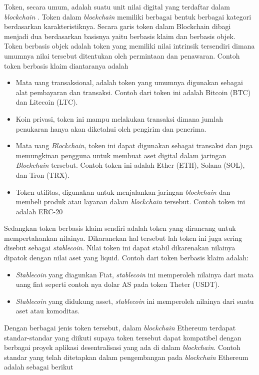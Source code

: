 Token, secara umum, adalah suatu unit nilai digital yang terdaftar dalam \emph{blockchain}  \parencite{PierluigiFreni}. Token dalam \emph{blockchain} memiliki berbagai bentuk berbagai kategori berdasarkan karakteristiknya. Secara garis token dalam Blockchain dibagi menjadi dua berdasarkan basisnya yaitu berbasis klaim dan berbasis objek. Token berbasis objek adalah token yang memiliki nilai intrinsik tersendiri dimana umumnya nilai tersebut ditentukan oleh permintaan dan penawaran. Contoh token berbasis klaim diantaranya adalah
\begin{itemize}
  \item Mata uang transaksional, adalah token yang umumnya digunakan sebagai alat pembayaran dan transaksi. Contoh dari token ini adalah Bitcoin (BTC) dan Litecoin (LTC).
  \item Koin privasi, token ini mampu melakukan transaksi dimana jumlah penukaran hanya akan diketahui oleh pengirim dan penerima.
  \item Mata uang \emph{Blockchain}, token ini dapat digunakan sebagai transaksi dan juga memungkinan pengguna untuk membuat aset digital dalam jaringan \emph{Blockchain} tersebut. Contoh token ini adalah Ether (ETH), Solana (SOL), dan Tron (TRX).
  \item Token utilitas, digunakan untuk menjalankan jaringan \emph{blockchain} dan membeli produk atau layanan dalam \emph{blockchain} tersebut. Contoh token ini adalah ERC-20
\end{itemize}
Sedangkan token berbasis klaim sendiri adalah token yang dirancang untuk mempertahankan nilainya. Dikaranekan hal tersebut lah token ini juga sering disebut sebagai \emph{stablecoin}. Nilai token ini dapat stabil dikarenakan nilainya dipatok dengan nilai aset yang liquid. Contoh dari token berbasis klaim adalah:
\begin{itemize}
  \item \emph{Stablecoin} yang diagunkan Fiat, \emph{stablecoin} ini memperoleh nilainya dari mata uang fiat seperti contoh nya dolar AS pada token Theter (USDT).
  \item \emph{Stablecoin} yang didukung asset, \emph{stablecoin} ini memperoleh nilainya dari suatu aset atau komoditas.
\end{itemize}
Dengan berbagai jenis token tersebut, dalam \emph{blockchain} Ethereum terdapat standar-standar yang diikuti supaya token tersebut dapat kompatibel dengan berbagai proyek aplikasi desentralisasi yang ada di dalam \emph{blockchain}. Contoh standar yang telah ditetapkan dalam pengembangan pada \emph{blockchain} Ethereum adalah sebagai berikut
